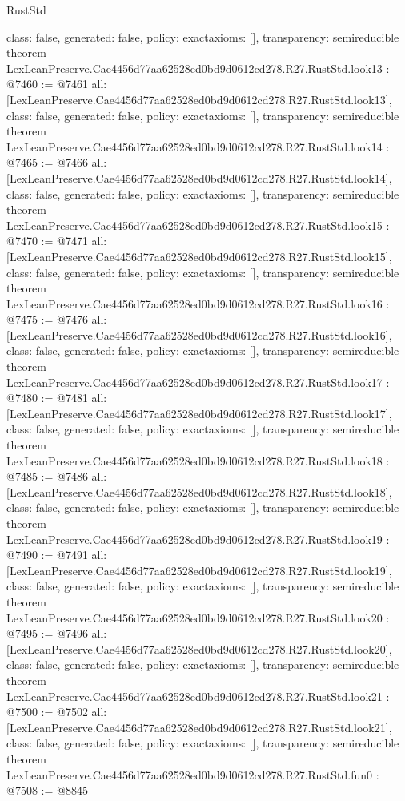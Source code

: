 \begin{lexlean}{RustStd}
\begin{coremodule}
{  class: false,
  generated: false,
  policy: exact{axioms: []},
  transparency: semireducible
}
theorem LexLeanPreserve.Cae4456d77aa62528ed0bd9d0612cd278.R27.RustStd.look13 : @7460 := @7461 {
  all: [LexLeanPreserve.Cae4456d77aa62528ed0bd9d0612cd278.R27.RustStd.look13],
  class: false,
  generated: false,
  policy: exact{axioms: []},
  transparency: semireducible
}
theorem LexLeanPreserve.Cae4456d77aa62528ed0bd9d0612cd278.R27.RustStd.look14 : @7465 := @7466 {
  all: [LexLeanPreserve.Cae4456d77aa62528ed0bd9d0612cd278.R27.RustStd.look14],
  class: false,
  generated: false,
  policy: exact{axioms: []},
  transparency: semireducible
}
theorem LexLeanPreserve.Cae4456d77aa62528ed0bd9d0612cd278.R27.RustStd.look15 : @7470 := @7471 {
  all: [LexLeanPreserve.Cae4456d77aa62528ed0bd9d0612cd278.R27.RustStd.look15],
  class: false,
  generated: false,
  policy: exact{axioms: []},
  transparency: semireducible
}
theorem LexLeanPreserve.Cae4456d77aa62528ed0bd9d0612cd278.R27.RustStd.look16 : @7475 := @7476 {
  all: [LexLeanPreserve.Cae4456d77aa62528ed0bd9d0612cd278.R27.RustStd.look16],
  class: false,
  generated: false,
  policy: exact{axioms: []},
  transparency: semireducible
}
theorem LexLeanPreserve.Cae4456d77aa62528ed0bd9d0612cd278.R27.RustStd.look17 : @7480 := @7481 {
  all: [LexLeanPreserve.Cae4456d77aa62528ed0bd9d0612cd278.R27.RustStd.look17],
  class: false,
  generated: false,
  policy: exact{axioms: []},
  transparency: semireducible
}
theorem LexLeanPreserve.Cae4456d77aa62528ed0bd9d0612cd278.R27.RustStd.look18 : @7485 := @7486 {
  all: [LexLeanPreserve.Cae4456d77aa62528ed0bd9d0612cd278.R27.RustStd.look18],
  class: false,
  generated: false,
  policy: exact{axioms: []},
  transparency: semireducible
}
theorem LexLeanPreserve.Cae4456d77aa62528ed0bd9d0612cd278.R27.RustStd.look19 : @7490 := @7491 {
  all: [LexLeanPreserve.Cae4456d77aa62528ed0bd9d0612cd278.R27.RustStd.look19],
  class: false,
  generated: false,
  policy: exact{axioms: []},
  transparency: semireducible
}
theorem LexLeanPreserve.Cae4456d77aa62528ed0bd9d0612cd278.R27.RustStd.look20 : @7495 := @7496 {
  all: [LexLeanPreserve.Cae4456d77aa62528ed0bd9d0612cd278.R27.RustStd.look20],
  class: false,
  generated: false,
  policy: exact{axioms: []},
  transparency: semireducible
}
theorem LexLeanPreserve.Cae4456d77aa62528ed0bd9d0612cd278.R27.RustStd.look21 : @7500 := @7502 {
  all: [LexLeanPreserve.Cae4456d77aa62528ed0bd9d0612cd278.R27.RustStd.look21],
  class: false,
  generated: false,
  policy: exact{axioms: []},
  transparency: semireducible
}
theorem LexLeanPreserve.Cae4456d77aa62528ed0bd9d0612cd278.R27.RustStd.fun0 : @7508 := @8845 {
}
\end{coremodule}
\end{lexlean}
